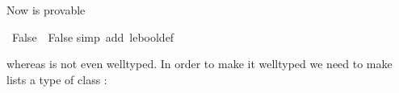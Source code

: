 \begin{isabellebody}
\begin{isamarkuptext}%
Now  is provable%
\end{isamarkuptext}%
\ {\isachardoublequote}False\ {\isacharless}{\isacharless}{\isacharequal}\ False{\isachardoublequote}\isanewline
{}simp\ add{\isacharcolon}\ le{\isacharunderscore}bool{\isacharunderscore}def{\isacharparenright}%
\begin{isamarkuptext}%
\noindent
whereas \isa{{\isacharbrackleft}{\isacharbrackright}\ {\isacharless}{\isacharless}{\isacharequal}\ {\isacharbrackleft}{\isacharbrackright}} is not even welltyped. In order to make it welltyped
we need to make lists a type of class :%
\end{isamarkuptext}%
\end{isabellebody}%
